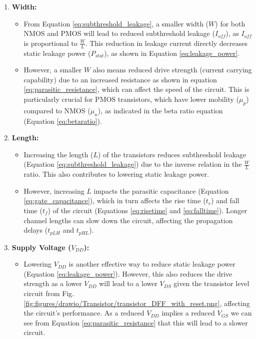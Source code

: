 \begin{enumerate}
    \item \textbf{Width:}
    \begin{itemize}
        \item From Equation \ref{eq:subthreshold_leakage}, a smaller width ($W$) for both NMOS and PMOS will lead to reduced subthreshold leakage (\(I_{off}\)), as \(I_{off}\) is proportional to $\frac{W}{L}$. This reduction in leakage current directly decreases static leakage power (\(P_{stat}\)), as shown in Equation \ref{eq:leakage_power}.
        \item However, a smaller $W$ also means reduced drive strength (current carrying capability) due to an increased resistance as shown in equation \ref{eq:parasitic_resistance}, which can affect the speed of the circuit. This is particularly crucial for PMOS transistors, which have lower mobility (\(\mu_p\)) compared to NMOS (\(\mu_n\)), as indicated in the beta ratio equation (Equation \ref{eq:betaratio}).
    \end{itemize}

    \item \textbf{Length:}
    \begin{itemize}
        \item Increasing the length ($L$) of the transistors reduces subthreshold leakage (Equation \ref{eq:subthreshold_leakage}) due to the inverse relation in the $\frac{W}{L}$ ratio. This also contributes to lowering static leakage power.
        \item However, increasing $L$ impacts the parasitic capacitance (Equation \ref{eq:gate_capacitance}), which in turn affects the rise time ($t_r$) and fall time ($t_f$) of the circuit (Equations \ref{eq:risetime} and \ref{eq:falltime}). Longer channel lengths can slow down the circuit, affecting the propagation delays ($t_{pLH}$ and $t_{pHL}$).
    \end{itemize}


    \item \textbf{Supply Voltage ($V_{DD}$):}
    \begin{itemize}
        \item Lowering $V_{DD}$ is another effective way to reduce static leakage power (Equation \ref{eq:leakage_power}). However, this also reduces the drive strength as a lower $V_{DD}$ will lead to a lower $V_{DS}$ given the transistor level circuit from Fig. \ref{fig:figures/drawio/Transistor/transistor_DFF_with_reset.png}, affecting the circuit's performance. As a reduced $V_{DD}$ implies a reduced $V_{GS}$ we can see from Equation \ref{eq:parasitic_resistance} that this will lead to a slower circuit.
    \end{itemize}


\end{enumerate}
